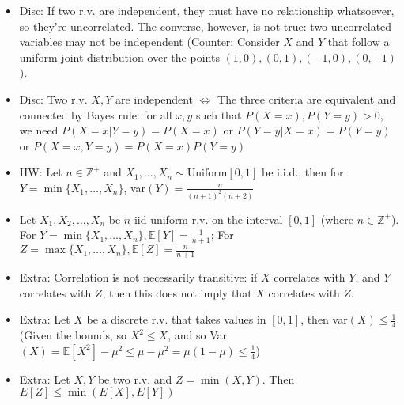\documentclass{article}
\begin{document}
\begin{itemize}
	\item Disc: If two r.v. are independent, they must have no relationship whatsoever, so they're uncorrelated. The converse, however, is not true: two uncorrelated variables may not be independent (Counter: Consider $X$ and $Y$ that follow a uniform joint distribution over the points $(1,0),(0,1),(-1,0),(0,-1)$).
	\item Disc: Two r.v. $X,Y$ are independent $\iff$ The three criteria are equivalent and connected by Bayes rule: for all $x,y$ such that $P(X=x), P(Y=y)>0$, we need $P(X=x|Y=y) = P(X=x)$ or $P(Y=y|X=x) = P(Y=y)$ or $P(X=x,Y=y) = P(X=x)P(Y=y)$
	\item HW: Let $n\in\mathbb{Z}^+$ and $X_1,\dots,X_n \sim\text{Uniform}[0,1]$ be i.i.d., then for $Y = \min\{X_1,\dots,X_n\}$, var$(Y) = \frac{n}{(n+1)^2(n+2)}$
	\item Let $X_1,X_2,\dots,X_n$ be $n$ iid uniform r.v. on the interval $[0, 1]$ (where $n\in\mathbb{Z}^+$). For $Y = \min\{X_1,\dots,X_n\}, \mathbb{E}[Y] = \frac{1}{n+1}$; For $Z = \max\{X_1,\dots,X_n\}, \mathbb{E}[Z] = \frac{n}{n+1}$

	\item Extra: Correlation is not necessarily transitive: if $X$ correlates with $Y$, and $Y$ correlates with $Z$, then this does not imply that $X$ correlates with $Z$.

	\item Extra: Let $X$ be a discrete r.v. that takes values in $[0,1]$, then var$(X)\leq \frac{1}{4}$ (Given the bounds, so $X^2\leq X$, and so
	Var$(X) = \mathbb{E}[X^2] - \mu^2 \leq \mu - \mu^2 = \mu(1-\mu) \leq \frac{1}{4}$)
	\item Extra: Let $X,Y$ be two r.v. and $Z = \min(X,Y)$. Then $E[Z]\leq\min(E[X],E[Y])$
\end{itemize}
\end{document}
